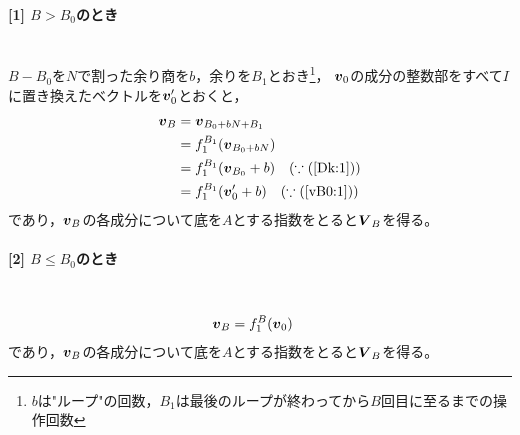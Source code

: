 \documentclass{article}
\newcommand{\myparagraph}[1]{\paragraph{#1}\mbox{}\\}
\def\vector#1{\mbox{\boldmath $#1$}}
\begin{document}
\myparagraph{[1] $B > B_0$のとき}

$B - B_0$を$N$で割った余り商を$b$，余りを$B_1$とおき\footnote{$b$は"ループ"の回数，$B_1$は最後のループが終わってから$B$回目に至るまでの操作回数}，
$\vector{v}_0$の成分の整数部をすべて$I$に置き換えたベクトルを$\vector{v}'_0$とおくと，
\begin{alignat}{1}
    \vector{v}_B &= \vector{v}_{B_0 + bN + B_1} \\
                 &= f_1^{B_1}( \vector{v}_{B_0 + bN} ) \\
                 &= f_1^{B_1}( \vector{v}_{B_0} + b ) \quad (\because (\ref{Dk:1})) \\
                 &= f_1^{B_1}( \vector{v}'_0 + b ) \quad (\because (\ref{vB0:1}))
\end{alignat}
であり，$\vector{v}_B$の各成分について底を$A$とする指数をとると$\vector{V}_B$を得る。

\myparagraph{[2] $B \leq B_0$のとき}

\begin{alignat}{1}
    \vector{v}_B &= f_1^{B}(\vector{v}_0)
\end{alignat}
であり，$\vector{v}_B$の各成分について底を$A$とする指数をとると$\vector{V}_B$を得る。
\end{document}
